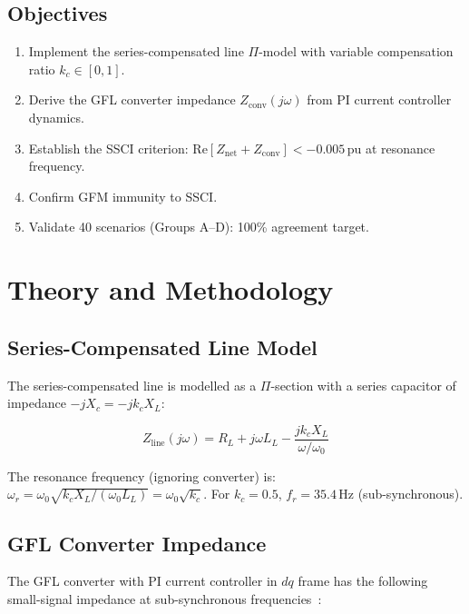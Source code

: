\documentclass[11pt, a4paper]{article}
\newcommand{\pu}{\,\text{pu}}
\begin{document}
\subsection{Objectives}

\begin{enumerate}
  \item Implement the series-compensated line $\Pi$-model with variable
    compensation ratio $k_c \in [0, 1]$.
  \item Derive the GFL converter impedance $Z_{\mathrm{conv}}(j\omega)$ from
    PI current controller dynamics.
  \item Establish the SSCI criterion: $\mathrm{Re}[Z_{\mathrm{net}} +
    Z_{\mathrm{conv}}] < -0.005\pu$ at resonance frequency.
  \item Confirm GFM immunity to SSCI.
  \item Validate 40 scenarios (Groups A--D): 100\% agreement target.
\end{enumerate}

\section{Theory and Methodology}
\label{sec:theory}

\subsection{Series-Compensated Line Model}

The series-compensated line is modelled as a $\Pi$-section with a series
capacitor of impedance $-jX_c = -jk_c X_L$:

\begin{equation}
  Z_{\mathrm{line}}(j\omega) = R_L + j\omega L_L - \frac{jk_c X_L}{\omega/\omega_0}
  \label{eq:series_comp}
\end{equation}

The resonance frequency (ignoring converter) is:
$\omega_r = \omega_0 \sqrt{k_c X_L / (\omega_0 L_L)} = \omega_0\sqrt{k_c}$.
For $k_c = 0.5$, $f_r = 35.4\,\text{Hz}$ (sub-synchronous).

\subsection{GFL Converter Impedance}

The GFL converter with PI current controller in $dq$ frame has the
following small-signal impedance at sub-synchronous frequencies~\cite{Sun2011}:
\end{document}
